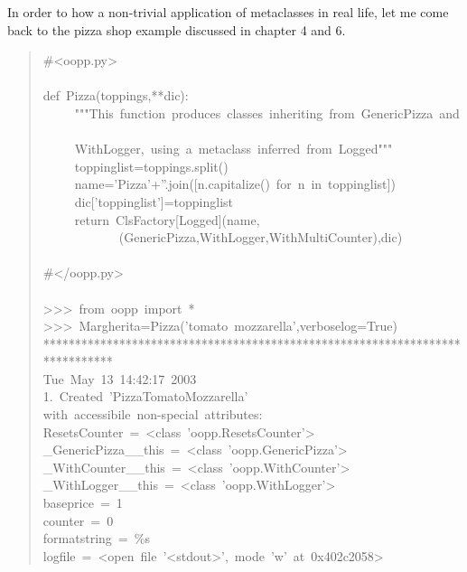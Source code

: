 \documentclass[10pt,english]{article}
\begin{document}
In order to how a non-trivial application of metaclasses in real life,
let me come back to the pizza shop example discussed in chapter 4 and 6.
\begin{quote}
\begin{ttfamily}\begin{flushleft}
\mbox{{\#}<oopp.py>}\\
\mbox{}\\
\mbox{def~Pizza(toppings,**dic):~}\\
\mbox{~~~~~"""This~function~produces~classes~inheriting~from~GenericPizza~and~}\\
\mbox{~~~~~WithLogger,~using~a~metaclass~inferred~from~Logged"""}\\
\mbox{~~~~~toppinglist=toppings.split()}\\
\mbox{~~~~~name='Pizza'+''.join([n.capitalize()~for~n~in~toppinglist])}\\
\mbox{~~~~~dic['toppinglist']=toppinglist}\\
\mbox{~~~~~return~ClsFactory[Logged](name,}\\
\mbox{~~~~~~~~~~~~(GenericPizza,WithLogger,WithMultiCounter),dic)}\\
\mbox{}\\
\mbox{{\#}</oopp.py>}\\
\mbox{}\\
\mbox{>>>~from~oopp~import~*}\\
\mbox{>>>~Margherita=Pizza('tomato~mozzarella',verboselog=True)}\\
\mbox{*****************************************************************************}\\
\mbox{Tue~May~13~14:42:17~2003}\\
\mbox{1.~Created~'PizzaTomatoMozzarella'}\\
\mbox{with~accessibile~non-special~attributes:}\\
\mbox{ResetsCounter~=~<class~'oopp.ResetsCounter'>}\\
\mbox{{\_}GenericPizza{\_}{\_}this~=~<class~'oopp.GenericPizza'>}\\
\mbox{{\_}WithCounter{\_}{\_}this~=~<class~'oopp.WithCounter'>}\\
\mbox{{\_}WithLogger{\_}{\_}this~=~<class~'oopp.WithLogger'>}\\
\mbox{baseprice~=~1}\\
\mbox{counter~=~0}\\
\mbox{formatstring~=~{\%}s}\\
\mbox{logfile~=~<open~file~'<stdout>',~mode~'w'~at~0x402c2058>}\\

\end{flushleft}
\end{ttfamily}
\end{quote}
\end{document}
